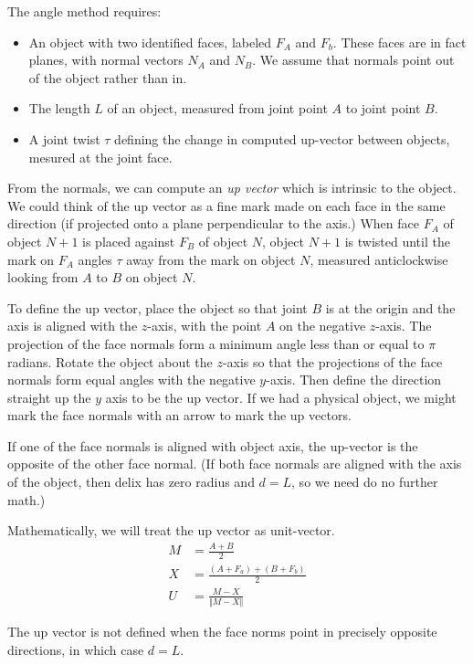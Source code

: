 \documentclass[11pt]{article}
\begin{document}
The angle method requires:
\begin{itemize}
\item An object with two identified faces, labeled $F_A$ and $F_b$. These faces are in
  fact planes, with normal vectors $N_A$ and $N_B$. We assume that normals point out
  of the object rather than in.
\item The length $L$ of an object, measured from joint point $A$ to joint point $B$.
\item A joint twist $\tau$ defining the change in computed up-vector between objects,
  mesured at the joint face.
\end{itemize}

From the normals, we can compute an {\em up vector} which is intrinsic to the object.
We could think of the up vector as a fine mark made on each face in the same direction
(if projected onto a plane perpendicular to the axis.) When face $F_A$ of object $N+1$
is placed against $F_B$ of object $N$, object $N+1$ is twisted until the mark on $F_A$ angles
$\tau$ away from the mark on object $N$, measured anticlockwise looking from $A$ to $B$ on
object $N$.

To define the up vector, place the object so that joint $B$ is at the origin and the
axis is aligned with the $z$-axis, with the point $A$ on the negative $z$-axis.
The projection of the face normals form a minimum angle less than or equal to $\pi$
radians. Rotate the object about the $z$-axis so that the projections of the face normals
form equal angles with the negative $y$-axis. Then define the direction straight up
the $y$ axis to be the up vector. If we had a physical object, we might mark the face
normals with an arrow to mark the up vectors.

If one of the face normals is aligned with object axis, the up-vector is the opposite
of the other face normal. (If both face normals are aligned with the axis of the object,
then delix has zero radius and $d = L$, so we need do no further math.)

Mathematically, we will treat the up vector as unit-vector.
\begin{align}
  M &= \frac{A+B}{2} \\
  X &= \frac{(A+F_a) + (B+F_b)}{2} \\
  U &= \frac{M - X}{\Vert M - X \Vert}
\end{align}

The up vector is not defined when the face norms point in precisely opposite directions,
in which case $d = L$.
\end{document}
